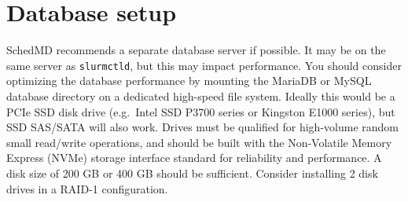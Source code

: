 \section{Database setup} \label{sec:slurmDB}

SchedMD recommends a separate database server if possible. It may be on the same server as \texttt{slurmctld}, but this may impact performance. You should consider optimizing the database performance by mounting the MariaDB or MySQL database directory on a dedicated high-speed file system. Ideally this would be a PCIe SSD disk drive (e.g.\ Intel SSD P3700 series or Kingston E1000 series), but SSD SAS/SATA will also work. Drives must be qualified for high-volume random small read/write operations, and should be built with the Non-Volatile Memory Express (NVMe) storage interface standard for reliability and performance. A disk size of 200 GB or 400 GB should be sufficient. Consider installing 2 disk drives in a RAID-1 configuration.

